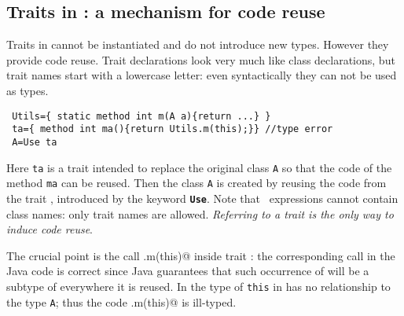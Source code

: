 \saveSpace
\subsection{Traits in \name: a mechanism for code reuse}
\saveSpace
Traits in \name cannot be instantiated and do not introduce new
types. However they provide code reuse.
Trait declarations 
look very much like class declarations, but trait names 
start with a lowercase letter: even syntactically they can not be used as types.
\saveSpace\saveSpace
\begin{lstlisting}
 Utils={ static method int m(A a){return ...} }
 ta={ method int ma(){return Utils.m(this);}} //type error
 A=Use ta
\end{lstlisting}
\saveSpace\saveSpace
\noindent Here \lstinline{ta} is a trait intended to replace the
original class \lstinline{A} so that the code of the method
\lstinline{ma} can be reused. Then the class \lstinline{A} 
is created by reusing the code from the trait \Q@ta@, introduced by the keyword 
{\bf \lstinline{Use}}. Note that \use\ expressions cannot contain class names: only trait
names are allowed.
\emph{Referring to a trait is the only way to induce code reuse}.

The crucial point is the call \Q@Utils.m(this)@ inside trait \Q@ta@:
the corresponding call in the Java code is correct since Java guarantees that such occurrence of \Q@this@ will be a subtype of \Q@A@ everywhere it is reused.
In \name 
the type of \lstinline{this} in
\Q@ta@ has no relationship to the type \lstinline{A};
thus the code \Q@Utils.m(this)@ is ill-typed.

